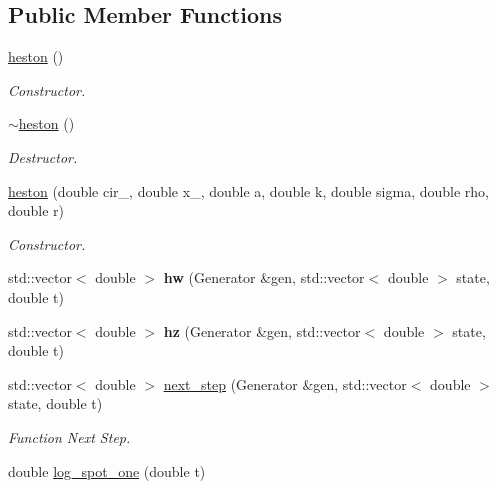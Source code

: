 \subsection*{Public Member Functions}
\begin{DoxyCompactItemize}
\item 
\mbox{\label{classheston_a3938ade2d7a6d3af9130bba2066618d2}} 
\mbox{\hyperlink{classheston_a3938ade2d7a6d3af9130bba2066618d2}{heston}} ()
\begin{DoxyCompactList}\small\item\em Constructor. \end{DoxyCompactList}\item 
\mbox{\label{classheston_a443a0ec8ea9e1c14576f7ba6ca602dd4}} 
\mbox{\hyperlink{classheston_a443a0ec8ea9e1c14576f7ba6ca602dd4}{$\sim$heston}} ()
\begin{DoxyCompactList}\small\item\em Destructor. \end{DoxyCompactList}\item 
\mbox{\label{classheston_a377c1e6ea58b4078f1ae4ddef05d7251}} 
\mbox{\hyperlink{classheston_a377c1e6ea58b4078f1ae4ddef05d7251}{heston}} (double cir\+\_, double x\+\_, double a, double k, double sigma, double rho, double r)
\begin{DoxyCompactList}\small\item\em Constructor. \end{DoxyCompactList}\item 
\mbox{\label{classheston_ae71c07c92e43ecf8320baa4085fc67b1}} 
std\+::vector$<$ double $>$ {\bfseries hw} (Generator \&gen, std\+::vector$<$ double $>$ state, double t)
\item 
\mbox{\label{classheston_a901689fa5b94062ec3b1b1371d0107fa}} 
std\+::vector$<$ double $>$ {\bfseries hz} (Generator \&gen, std\+::vector$<$ double $>$ state, double t)
\item 
std\+::vector$<$ double $>$ \mbox{\hyperlink{classheston_a81ef826578f2a62320698e88cc2b1b3b}{next\+\_\+step}} (Generator \&gen, std\+::vector$<$ double $>$ state, double t)
\begin{DoxyCompactList}\small\item\em Function Next Step. \end{DoxyCompactList}\item 
double \mbox{\hyperlink{classheston_a574fdb0c7e744e931bf3e8fd000ea5ca}{log\+\_\+spot\+\_\+one}} (double t)
\end{DoxyCompactItemize}
